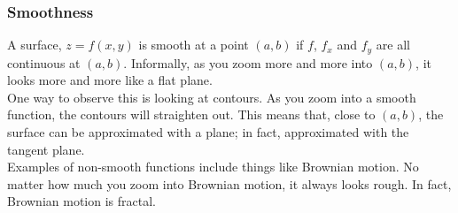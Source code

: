 \documentclass{report}
\begin{document}

\subsubsection*{Smoothness}
A surface, $z = f(x,y)$ is smooth at a point $(a,b)$ if $f$, $f_x$ and $f_y$ are all continuous at $(a,b)$. Informally, as you zoom more and more into $(a,b)$, it looks more and more like a flat plane.\\
One way to observe this is looking at contours. As you zoom into a smooth function, the contours will straighten out. This means that, close to $(a,b)$, the surface can be approximated with a plane; in fact, approximated with the tangent plane.\\
Examples of non-smooth functions include things like Brownian motion. No matter how much you zoom into Brownian motion, it always looks rough. In fact, Brownian motion is fractal.
\end{document}
